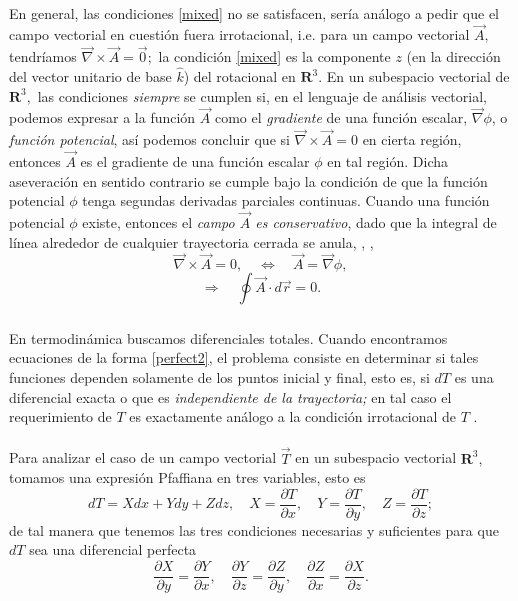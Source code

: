 \documentclass{article}
\theoremstyle{definition} \newtheorem{defi}{Definici\'on}
\theoremstyle{definition} \newtheorem{teo}{Teorema}
\theoremstyle{definition} \newtheorem{cor}{Corolario}
\begin{document}
\paragraph{}
En general, las condiciones \eqref{mixed} no se satisfacen, ser\'ia an\'alogo a pedir que el campo vectorial en cuesti\'on fuera irrotacional, i.e. para un campo vectorial $\vec A,$ tendr\'iamos $\vec \nabla \times \vec A = \vec 0;$ la condici\'on \eqref{mixed} es la componente $z$ (en la direcci\'on del vector unitario de base $\hat k$) del rotacional en $\mathbf{R}^3.$ En un subespacio vectorial de $\mathbf{R}^3,$ las condiciones \emph{siempre} se cumplen si, en el lenguaje de an\'alisis vectorial, podemos expresar a la funci\'on $\vec A$ como el \emph{gradiente} de una funci\'on escalar, $\vec \nabla \phi$, o \emph{funci\'on potencial}, as\'i podemos concluir que si $\vec \nabla \times \vec A = 0$ en cierta regi\'on, entonces $\vec A$ es el gradiente de una funci\'on escalar $\phi$ en tal regi\'on. Dicha aseveraci\'on en sentido contrario se cumple bajo la condici\'on de que la funci\'on potencial $\phi$ tenga segundas derivadas parciales continuas. Cuando una funci\'on potencial $\phi$ existe, entonces el \emph{campo $\vec A$ es conservativo}, dado que la integral de l\'inea alrededor de cualquier trayectoria cerrada se anula, \cite{HI}, \cite{BU},
$$\vec \nabla \times \vec A = 0, \quad \Leftrightarrow \quad \vec A = \vec \nabla \phi,$$
$$\Rightarrow \quad \oint \vec A \cdot d \vec r = 0.$$
\subparagraph{}
En termodin\'amica buscamos diferenciales totales. Cuando encontramos ecuaciones de la forma \eqref{perfect2}, el problema consiste en determinar si tales funciones dependen solamente de los puntos inicial y final, esto es, si $dT$ es una diferencial exacta o que es \emph{independiente de la trayectoria;} en tal caso el requerimiento de $T$ es exactamente an\'alogo a la condici\'on irrotacional de $T$ \cite{AR}.
\paragraph{}
Para analizar el caso de un campo vectorial $\vec T$ en un subespacio vectorial $\mathbf{R}^3,$ tomamos una expresi\'on Pfaffiana en tres variables, esto es
\begin{equation}\label{trediff}
dT=Xdx+Ydy+Zdz,\quad X=\frac{\partial T}{\partial x},\quad Y=\frac{\partial T}{\partial y},\quad Z=\frac{\partial T}{\partial z};
\end{equation}
de tal manera que tenemos las tres condiciones necesarias y suficientes para que $dT$ sea una diferencial perfecta
\begin{equation}\label{ncurlcond}
\frac{\partial X}{\partial y}=\frac{\partial Y}{\partial x},\quad\frac{\partial Y}{\partial z}=\frac{\partial Z}{\partial y},\quad\frac{\partial Z}{\partial x}=\frac{\partial X}{\partial z}.
\end{equation}
\end{document}
